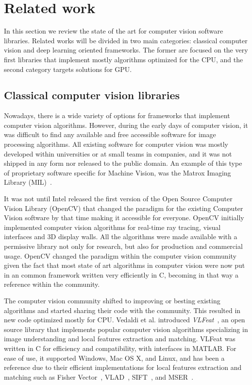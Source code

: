 
\section{Related work}
\label{section:related_work}
In this section we  review  the state of the art for computer vision software libraries. Related works will be divided in two main categories: classical computer vision and deep learning oriented  frameworks. The former are focused on  the very first libraries that implement mostly algorithms optimized for the CPU, and the second category targets solutions for GPU.

\subsection{Classical computer vision libraries}
\label{section:related_work:traditional_vision}
Nowadays, there is a wide variety of options for frameworks that implement computer vision algorithms. However, during the early days of computer vision, it was difficult to find any available and free accessible software for image processing algorithms. All existing software for computer vision was mostly developed within universities or at small teams in companies, and it was not shipped in any form nor released to the public domain. An example of this type of proprietary software specific for Machine Vision, was the Matrox Imaging Library (MIL)~\citep{matrox_imaging}.

It was not until Intel released the first version of the Open Source Computer Vision Library (OpenCV) that changed the paradigm for the existing Computer Vision software by that time making it accessible for everyone. OpenCV \citep{opencv} initially implemented computer vision algorithms for real-time ray tracing, visual interfaces and 3D display walls. All the algorithms were made available with a permissive library not only for research, but also for production and commercial usage. OpenCV changed the paradigm within the computer vision community given the fact that most   state of art algorithms in computer vision were now put in an common framework written very efficiently in C, becoming in that way a reference within the community.

The computer vision community shifted to improving or besting existing algorithms and started sharing their code with the community. This resulted in new code optimized mostly for CPU. Vedaldi et al. introduced \textit{VLFeat}~\citep{vedaldi08vlfeat}, an open source library that implements popular computer vision algorithms specializing in image understanding and local features extraction and matching. VLFeat was written in C for efficiency and compatibility, with interfaces in MATLAB. For ease of use, it supported Windows, Mac OS X, and Linux, and has been a reference due to their efficient implementations for local features extraction and matching such as Fisher Vector~\citep{Sanchez2013}, VLAD~\citep{VLAD2010}, SIFT~\citep{Lowe2004}, and MSER~\citep{Matas2002}.

